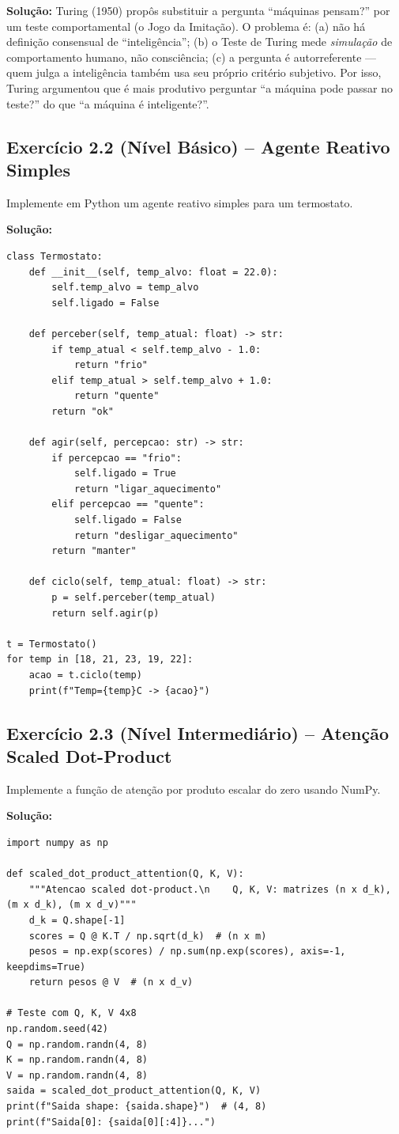 \textbf{Solução:} Turing (1950) propôs substituir a pergunta ``máquinas
pensam?'' por um teste comportamental (o Jogo da Imitação). O problema
é: (a) não há definição consensual de ``inteligência''; (b) o Teste de
Turing mede \emph{simulação} de comportamento humano, não consciência;
(c) a pergunta é autorreferente --- quem julga a inteligência também
usa seu próprio critério subjetivo. Por isso, Turing argumentou que é
mais produtivo perguntar ``a máquina pode passar no teste?'' do que
``a máquina é inteligente?''.

\subsection*{Exercício 2.2 (Nível Básico) -- Agente Reativo Simples}
Implemente em Python um agente reativo simples para um termostato.

\textbf{Solução:}
\begin{lstlisting}[style=pythonstyle]
class Termostato:
    def __init__(self, temp_alvo: float = 22.0):
        self.temp_alvo = temp_alvo
        self.ligado = False

    def perceber(self, temp_atual: float) -> str:
        if temp_atual < self.temp_alvo - 1.0:
            return "frio"
        elif temp_atual > self.temp_alvo + 1.0:
            return "quente"
        return "ok"

    def agir(self, percepcao: str) -> str:
        if percepcao == "frio":
            self.ligado = True
            return "ligar_aquecimento"
        elif percepcao == "quente":
            self.ligado = False
            return "desligar_aquecimento"
        return "manter"

    def ciclo(self, temp_atual: float) -> str:
        p = self.perceber(temp_atual)
        return self.agir(p)

t = Termostato()
for temp in [18, 21, 23, 19, 22]:
    acao = t.ciclo(temp)
    print(f"Temp={temp}C -> {acao}")
\end{lstlisting}

\subsection*{Exercício 2.3 (Nível Intermediário) -- Atenção Scaled Dot-Product}
Implemente a função de atenção por produto escalar do zero usando NumPy.

\textbf{Solução:}
\begin{lstlisting}[style=pythonstyle]
import numpy as np

def scaled_dot_product_attention(Q, K, V):
    """Atencao scaled dot-product.\n    Q, K, V: matrizes (n x d_k), (m x d_k), (m x d_v)"""
    d_k = Q.shape[-1]
    scores = Q @ K.T / np.sqrt(d_k)  # (n x m)
    pesos = np.exp(scores) / np.sum(np.exp(scores), axis=-1, keepdims=True)
    return pesos @ V  # (n x d_v)

# Teste com Q, K, V 4x8
np.random.seed(42)
Q = np.random.randn(4, 8)
K = np.random.randn(4, 8)
V = np.random.randn(4, 8)
saida = scaled_dot_product_attention(Q, K, V)
print(f"Saida shape: {saida.shape}")  # (4, 8)
print(f"Saida[0]: {saida[0][:4]}...")
\end{lstlisting}

